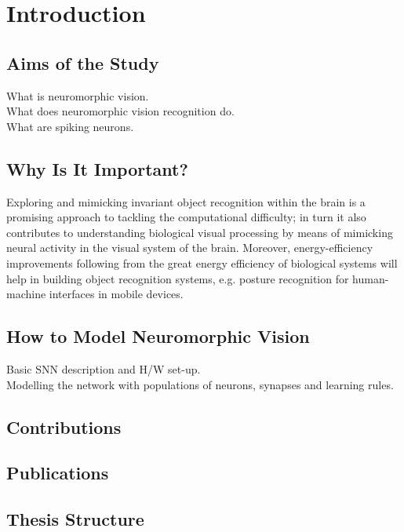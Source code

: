 \chapter{Introduction}
\label{cha:intro}

\section{Aims of the Study}
\label{sec:aim}
What is neuromorphic vision.\\
What does neuromorphic vision recognition do.\\
What are spiking neurons.\\

\section{Why Is It Important?}
\label{sec:imp}
Exploring and mimicking invariant object recognition within the brain is a promising approach to tackling the computational difficulty;
in turn it also contributes to understanding biological visual processing by means of mimicking neural activity in the visual system of the brain.
Moreover, energy-efficiency improvements following from the great energy efficiency of biological systems will help in building object recognition systems, e.g. posture recognition for human-machine interfaces in mobile devices.  

\section{How to Model Neuromorphic Vision}
\label{sec:how}
Basic SNN description and H/W set-up.\\
Modelling the network with populations of neurons, synapses and learning rules.

\section{Contributions}
\label{sec:ctb}

\section{Publications}

\section{Thesis Structure}
\label{sec:str}